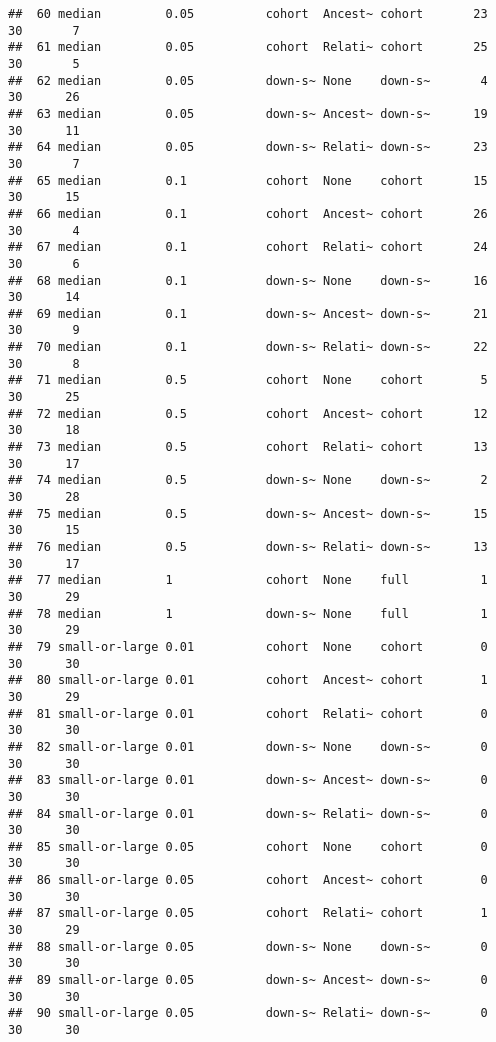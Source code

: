 \documentclass[
]{book}
\begin{document}
\begin{verbatim}
##  60 median         0.05          cohort  Ancest~ cohort       23      30       7
##  61 median         0.05          cohort  Relati~ cohort       25      30       5
##  62 median         0.05          down-s~ None    down-s~       4      30      26
##  63 median         0.05          down-s~ Ancest~ down-s~      19      30      11
##  64 median         0.05          down-s~ Relati~ down-s~      23      30       7
##  65 median         0.1           cohort  None    cohort       15      30      15
##  66 median         0.1           cohort  Ancest~ cohort       26      30       4
##  67 median         0.1           cohort  Relati~ cohort       24      30       6
##  68 median         0.1           down-s~ None    down-s~      16      30      14
##  69 median         0.1           down-s~ Ancest~ down-s~      21      30       9
##  70 median         0.1           down-s~ Relati~ down-s~      22      30       8
##  71 median         0.5           cohort  None    cohort        5      30      25
##  72 median         0.5           cohort  Ancest~ cohort       12      30      18
##  73 median         0.5           cohort  Relati~ cohort       13      30      17
##  74 median         0.5           down-s~ None    down-s~       2      30      28
##  75 median         0.5           down-s~ Ancest~ down-s~      15      30      15
##  76 median         0.5           down-s~ Relati~ down-s~      13      30      17
##  77 median         1             cohort  None    full          1      30      29
##  78 median         1             down-s~ None    full          1      30      29
##  79 small-or-large 0.01          cohort  None    cohort        0      30      30
##  80 small-or-large 0.01          cohort  Ancest~ cohort        1      30      29
##  81 small-or-large 0.01          cohort  Relati~ cohort        0      30      30
##  82 small-or-large 0.01          down-s~ None    down-s~       0      30      30
##  83 small-or-large 0.01          down-s~ Ancest~ down-s~       0      30      30
##  84 small-or-large 0.01          down-s~ Relati~ down-s~       0      30      30
##  85 small-or-large 0.05          cohort  None    cohort        0      30      30
##  86 small-or-large 0.05          cohort  Ancest~ cohort        0      30      30
##  87 small-or-large 0.05          cohort  Relati~ cohort        1      30      29
##  88 small-or-large 0.05          down-s~ None    down-s~       0      30      30
##  89 small-or-large 0.05          down-s~ Ancest~ down-s~       0      30      30
##  90 small-or-large 0.05          down-s~ Relati~ down-s~       0      30      30

\end{verbatim}
\end{document}
